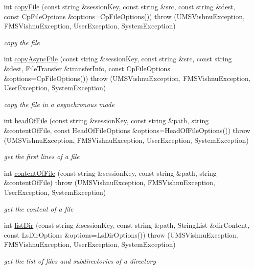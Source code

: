 \begin{DoxyCompactItemize}
int \hyperlink{namespacevishnu_a9c08b2960915cf530451df2c7e0d2316}{copyFile} (const string \&sessionKey, const string \&src, const string \&dest, const CpFileOptions \&options=CpFileOptions())  throw (UMSVishnuException, FMSVishnuException, UserException, SystemException)
\begin{DoxyCompactList}\small\item\em copy the file \item\end{DoxyCompactList}\item 
int \hyperlink{namespacevishnu_aa1f91396026194dd4f815035ec6b1f64}{copyAsyncFile} (const string \&sessionKey, const string \&src, const string \&dest, FileTransfer \&transferInfo, const CpFileOptions \&options=CpFileOptions())  throw (UMSVishnuException, FMSVishnuException, UserException, SystemException)
\begin{DoxyCompactList}\small\item\em copy the file in a asynchronous mode \item\end{DoxyCompactList}\item 
int \hyperlink{namespacevishnu_a2ce4c436458a99e531b2a2fe55c60854}{headOfFile} (const string \&sessionKey, const string \&path, string \&contentOfFile, const HeadOfFileOptions \&options=HeadOfFileOptions())  throw (UMSVishnuException, FMSVishnuException, UserException, SystemException)
\begin{DoxyCompactList}\small\item\em get the first lines of a file \item\end{DoxyCompactList}\item 
int \hyperlink{namespacevishnu_a626981a5333a6cf9980ecab82a130fe5}{contentOfFile} (const string \&sessionKey, const string \&path, string \&contentOfFile)  throw (UMSVishnuException, FMSVishnuException, UserException, SystemException)
\begin{DoxyCompactList}\small\item\em get the content of a file \item\end{DoxyCompactList}\item 
int \hyperlink{namespacevishnu_abcd5b8873e7974f79f3325cd187ade2d}{listDir} (const string \&sessionKey, const string \&path, StringList \&dirContent, const LsDirOptions \&options=LsDirOptions())  throw (UMSVishnuException, FMSVishnuException, UserException, SystemException)
\begin{DoxyCompactList}\small\item\em get the list of files and subdirectories of a directory \item\end{DoxyCompactList}\item 

\end{DoxyCompactItemize}
